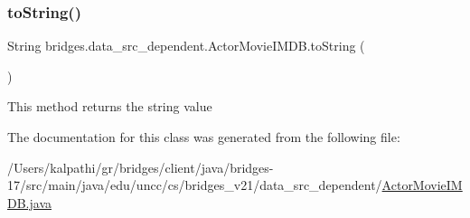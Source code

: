 \subsubsection{\texorpdfstring{to\+String()}{toString()}}
{\footnotesize\ttfamily String bridges.\+data\+\_\+src\+\_\+dependent.\+Actor\+Movie\+I\+M\+D\+B.\+to\+String (\begin{DoxyParamCaption}{ }\end{DoxyParamCaption})}

This method returns the string value 

The documentation for this class was generated from the following file\+:\begin{DoxyCompactItemize}
\item 
/\+Users/kalpathi/gr/bridges/client/java/bridges-\/17/src/main/java/edu/uncc/cs/bridges\+\_\+v21/data\+\_\+src\+\_\+dependent/\mbox{\hyperlink{_actor_movie_i_m_d_b_8java}{Actor\+Movie\+I\+M\+D\+B.\+java}}\end{DoxyCompactItemize}
